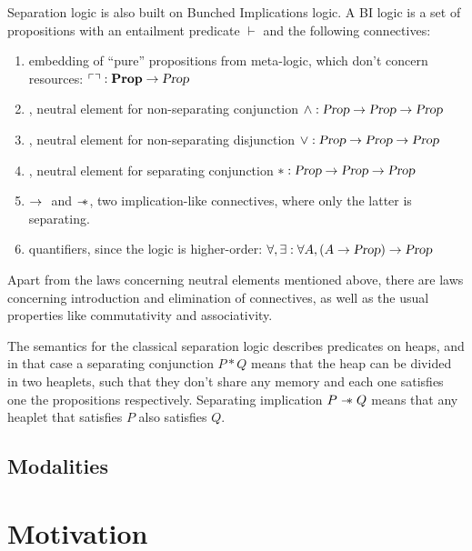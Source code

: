 Separation logic is also built on Bunched Implications logic.
A BI logic is a set of propositions \Prop with an entailment predicate \(\vdash\) and the following connectives:
\begin{enumerate}
\item embedding of ``pure'' propositions from meta-logic, which don't concern resources: \(\ulcorner   \urcorner : \textbf{Prop} \to \textsl{Prop}\)
\item \True, neutral element for non-separating conjunction \(\wedge : \textsl{Prop} \to \textsl{Prop} \to \textsl{Prop}\)
\item \False, neutral element for non-separating disjunction \(\vee : \textsl{Prop} \to \textsl{Prop} \to \textsl{Prop}\)
\item \emp, neutral element for separating conjunction \(* : \textsl{Prop} \to \textsl{Prop} \to \textsl{Prop}\)
\item \(\mathbin{\rightarrow}~\) and \(\mathrel{-\mkern-6mu*}\), two implication-like connectives, where only the latter is separating.
\item quantifiers, since the logic is higher-order: \(\forall, \exists : \forall A, (A \to \textsl{Prop}) \to \textsl{Prop}\)
\end{enumerate}

Apart from the laws concerning neutral elements mentioned above, there are laws concerning introduction and elimination of connectives, as well as the usual properties like commutativity and associativity.

The semantics for the classical separation logic \cite{reynoldsSeparationLogicLogic2002, ohearnLocalReasoningPrograms2001} describes predicates on heaps, and in that case a separating conjunction \(P * Q\) means that the heap can be divided in two heaplets, such that they don't share any memory and each one satisfies one the propositions respectively.
Separating implication \(P \mathrel{-\mkern-6mu*} Q\) means that any heaplet that satisfies \(P\) also satisfies \(Q\).





\subsection{Modalities}
\label{sec:modalities-intro}


\section{Motivation}
\label{sec:motivation}



